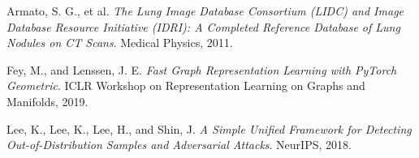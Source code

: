 \documentclass[12pt]{article}
\begin{document}
\begin{enumerate}[label={[\arabic*]}]
    \item Armato, S. G., et al. \textit{The Lung Image Database Consortium (LIDC) and Image Database Resource Initiative (IDRI): A Completed Reference Database of Lung Nodules on CT Scans}. Medical Physics, 2011.
    \item Fey, M., and Lenssen, J. E. \textit{Fast Graph Representation Learning with PyTorch Geometric}. ICLR Workshop on Representation Learning on Graphs and Manifolds, 2019.
    \item Lee, K., Lee, K., Lee, H., and Shin, J. \textit{A Simple Unified Framework for Detecting Out-of-Distribution Samples and Adversarial Attacks}. NeurIPS, 2018.
\end{enumerate}
\end{document}
